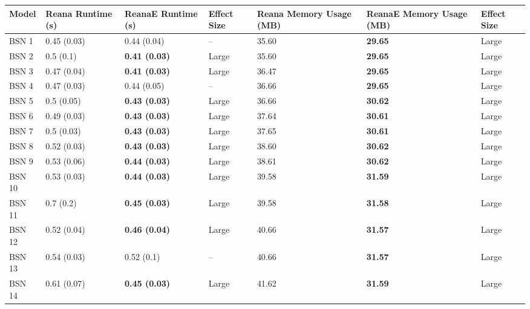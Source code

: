 \begin{tabular}{lllllll}
\toprule
  Model & Reana Runtime (s) &    ReanaE Runtime (s) & Effect Size & Reana Memory Usage (MB) & ReanaE Memory Usage (MB) & Effect Size \\
\midrule
  BSN 1 &       0.45 (0.03) &           0.44 (0.04) &          -- &                   35.60 &           \textbf{29.65} &       Large \\
  BSN 2 &         0.5 (0.1) &  \textbf{0.41 (0.03)} &       Large &                   35.60 &           \textbf{29.65} &       Large \\
  BSN 3 &       0.47 (0.04) &  \textbf{0.41 (0.03)} &       Large &                   36.47 &           \textbf{29.65} &       Large \\
  BSN 4 &       0.47 (0.03) &           0.44 (0.05) &          -- &                   36.66 &           \textbf{29.65} &       Large \\
  BSN 5 &        0.5 (0.05) &  \textbf{0.43 (0.03)} &       Large &                   36.66 &           \textbf{30.62} &       Large \\
  BSN 6 &       0.49 (0.03) &  \textbf{0.43 (0.03)} &       Large &                   37.64 &           \textbf{30.61} &       Large \\
  BSN 7 &        0.5 (0.03) &  \textbf{0.43 (0.03)} &       Large &                   37.65 &           \textbf{30.61} &       Large \\
  BSN 8 &       0.52 (0.03) &  \textbf{0.43 (0.03)} &       Large &                   38.60 &           \textbf{30.62} &       Large \\
  BSN 9 &       0.53 (0.06) &  \textbf{0.44 (0.03)} &       Large &                   38.61 &           \textbf{30.62} &       Large \\
 BSN 10 &       0.53 (0.03) &  \textbf{0.44 (0.03)} &       Large &                   39.58 &           \textbf{31.59} &       Large \\
 BSN 11 &         0.7 (0.2) &  \textbf{0.45 (0.03)} &       Large &                   39.58 &           \textbf{31.58} &       Large \\
 BSN 12 &       0.52 (0.04) &  \textbf{0.46 (0.04)} &       Large &                   40.66 &           \textbf{31.57} &       Large \\
 BSN 13 &       0.54 (0.03) &            0.52 (0.1) &          -- &                   40.66 &           \textbf{31.57} &       Large \\
 BSN 14 &       0.61 (0.07) &  \textbf{0.45 (0.03)} &       Large &                   41.62 &           \textbf{31.59} &       Large \\

\end{tabular}
